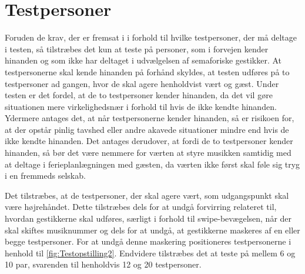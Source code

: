 \section{Testpersoner}
\label{TestpersonerSocialAccept}
%
Foruden de krav, der er fremsat i  i forhold til hvilke testpersoner, der må deltage i testen, så tilstræbes det kun at teste på personer, som i forvejen kender hinanden og som ikke har deltaget i udvælgelsen af semaforiske gestikker. At testpersonerne skal kende hinanden på forhånd skyldes, at testen udføres på to testpersoner ad gangen, hvor de skal agere henholdvist vært og gæst. Under testen er det fordel, at de to testpersoner kender hinanden, da det vil gøre situationen mere virkelighedsnær i forhold til hvis de ikke kendte hinanden. Ydermere antages det, at når testpersonerne kender hinanden, så er risikoen for, at der opstår pinlig tavshed eller andre akavede situationer mindre end hvis de ikke kendte hinanden. Det antages derudover, at fordi de to testpersoner kender hinanden, så bør det være nemmere for værten at styre musikken samtidig med at deltage i ferieplanlægningen med gæsten, da værten ikke først skal føle sig tryg i en fremmeds selskab. 

Det tilstræbes, at de testpersoner, der skal agere vært, som udgangspunkt skal være højrehåndet. Dette tilstræbes dels for at undgå forvirring relateret til, hvordan gestikkerne skal udføres, særligt i forhold til swipe-bevægelsen, når der skal skiftes musiknummer og dels for at undgå, at gestikkerne maskeres af en eller begge testpersoner. For at undgå denne maskering positioneres testpersonerne i henhold til \autoref{fig:Testopstilling2}. Endvidere tilstræbes det at teste på mellem 6 og 10 par, svarenden til henholdvis 12 og 20 testpersoner. 